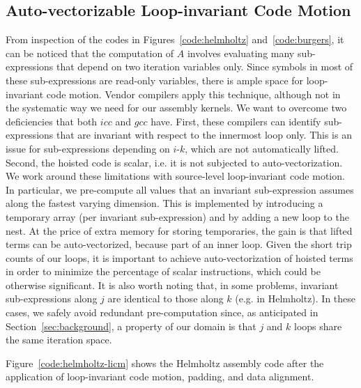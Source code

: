 \documentclass[conference]{IEEEtran}
\begin{document}
\subsection{Auto-vectorizable Loop-invariant Code Motion}
From inspection of the codes in Figures~\ref{code:helmholtz} and~\ref{code:burgers}, it can be noticed that the computation of $A$ involves evaluating many sub-expressions that depend on two iteration variables only. Since symbols in most of these sub-expressions are read-only variables, there is ample space for loop-invariant code motion. Vendor compilers apply this technique, although not in the systematic way we need for our assembly kernels. We want to overcome two deficiencies that both $icc$ and $gcc$ have. First, these compilers can identify sub-expressions that are invariant with respect to the innermost loop only. This is an issue for sub-expressions depending on $i$-$k$, which are not automatically lifted. Second, the hoisted code is scalar, i.e. it is not subjected to auto-vectorization. We work around these limitations with source-level loop-invariant code motion. In particular, we pre-compute all values that an invariant sub-expression assumes along the fastest varying dimension. This is implemented by introducing a temporary array (per invariant sub-expression) and by adding a new loop to the nest. At the price of extra memory for storing temporaries, the gain is that lifted terms can be auto-vectorized, because part of an inner loop. Given the short trip counts of our loops, it is important to achieve auto-vectorization of hoisted terms in order to minimize the percentage of scalar instructions, which could be otherwise significant. It is also worth noting that, in some problems, invariant sub-expressions along $j$ are identical to those along $k$ (e.g. in Helmholtz). In these cases, we safely avoid redundant pre-computation since, as anticipated in Section~\ref{sec:background}, a property of our domain is that $j$ and $k$ loops share the same iteration space.

Figure~\ref{code:helmholtz-licm} shows the Helmholtz assembly code after the application of loop-invariant code motion, padding, and data alignment.

\end{document}
